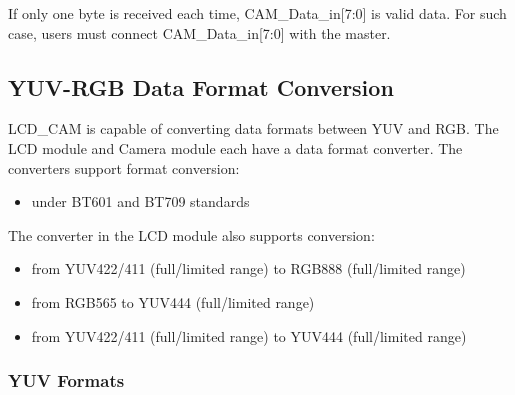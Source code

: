 \documentclass[main\_\_EN.tex]{subfiles}
\begin{document}
\begin{tiplisting}
If only one byte is received each time, CAM\_Data\_in[7:0] is valid data. For such case, users must connect CAM\_Data\_in[7:0] with the master.
\end{tiplisting}

\subsection{YUV-RGB Data Format Conversion}\label{sec:yuvrgb_config}

LCD\_CAM is capable of converting data formats between YUV and RGB. The LCD module and Camera module each have a data format converter. The converters support format conversion:
\begin{itemize}
    \item under BT601 and BT709 standards
\end{itemize}    

The converter in the LCD module also supports conversion:
        \begin{itemize}
        \item from YUV422/411 (full/limited range) to RGB888 (full/limited range)
        \item from RGB565  to YUV444 (full/limited range)
        \item from YUV422/411 (full/limited range) to YUV444 (full/limited range)
        \end{itemize}

\subsubsection{YUV Formats}
\end{document}
